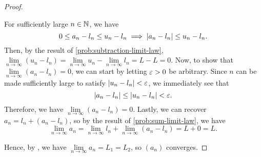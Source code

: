 \begin{problem}
\begin{proof}
    \begin{subproof}
      For sufficiently large $n \in \mathbb{N}$, we have
      \[
        0 \leq a_{n} - l_{n} \leq u_{n} - l_{n} \implies \left\lvert a_{n} - l_{n} \right\rvert \leq u_{n} - l_{n}.
      \]
      Then, by the result of \ref{prob:subtraction-limit-law}, 
      $\lim\limits_{n \to \infty} (u_{n} - l_{n}) = \lim\limits_{n \to \infty} u_{n} - \lim\limits_{n \to \infty} l_{n} = L - L = 0$.
      Now, to show that $\lim\limits_{n \to \infty} (a_{n} - l_{n}) = 0$, we
      can start by letting $\varepsilon > 0$ be arbitrary. Since $n$ can be made
      sufficiently large to satisfy $\left\lvert u_{n} - l_{n} \right\rvert < \varepsilon$, we
      immediately see that
      \[
        \left\lvert a_{n} - l_{n} \right\rvert \leq \left\lvert u_{n} - l_{n} \right\rvert < \varepsilon.
      \]
      Therefore, we have $\lim\limits_{n \to \infty} (a_{n} - l_{n}) = 0$.
      Lastly, we can recover $a_{n} = l_{n} + (a_{n} - l_{n})$, so by the result of \ref{prob:sum-limit-law}, we have 
      \[
        \lim_{n \to \infty} a_{n} = \lim_{n \to \infty} l_{n} + \lim_{n \to \infty} (a_{n} - l_{n}) = L + 0 = L.
      \]
    \end{subproof}

    Hence, by , we have $\lim\limits_{n \to \infty} a_{n} = L_{1} = L_{2}$, so $(a_{n})$ converges.

  \end{proof}

\end{problem}


